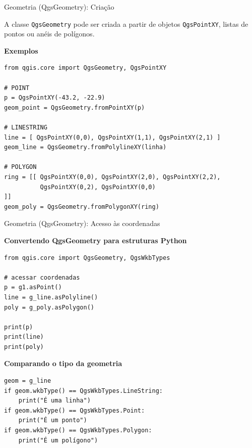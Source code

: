 \documentclass{beamer}
\begin{document}
\begin{frame}[fragile]{Geometria (QgsGeometry): Criação}
    
    A classe \texttt{QgsGeometry} pode ser criada a partir de objetos
    \texttt{QgsPointXY}, listas de pontos ou anéis de polígonos.
    
    \vspace{0.3cm}
    
    \textbf{Exemplos}
    
    \begin{verbatim}
from qgis.core import QgsGeometry, QgsPointXY

# POINT
p = QgsPointXY(-43.2, -22.9)
geom_point = QgsGeometry.fromPointXY(p)

# LINESTRING
line = [ QgsPointXY(0,0), QgsPointXY(1,1), QgsPointXY(2,1) ]
geom_line = QgsGeometry.fromPolylineXY(linha)

# POLYGON
ring = [[ QgsPointXY(0,0), QgsPointXY(2,0), QgsPointXY(2,2),
          QgsPointXY(0,2), QgsPointXY(0,0)
]]
geom_poly = QgsGeometry.fromPolygonXY(ring)
    \end{verbatim}
    
\end{frame}

\begin{frame}[fragile]{Geometria (QgsGeometry): Acesso às coordenadas}
    
    \textbf{Convertendo QgsGeometry para estruturas Python}
    
    \begin{verbatim}
from qgis.core import QgsGeometry, QgsWkbTypes

# acessar coordenadas
p = g1.asPoint()
line = g_line.asPolyline()
poly = g_poly.asPolygon()

print(p)
print(line)
print(poly)
    \end{verbatim}
    
    \vspace{0.2cm}
    
    \textbf{Comparando o tipo da geometria}
    
    \begin{verbatim}
geom = g_line
if geom.wkbType() == QgsWkbTypes.LineString:
    print("É uma linha")
if geom.wkbType() == QgsWkbTypes.Point:
    print("É um ponto")
if geom.wkbType() == QgsWkbTypes.Polygon:
    print("É um polígono")
    \end{verbatim}
    
\end{frame}
\end{document}
